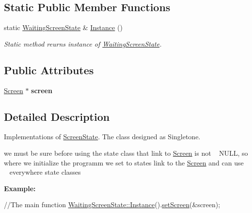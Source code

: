 \subsection*{Static Public Member Functions}
\begin{DoxyCompactItemize}
\item 
static \hyperlink{class_waiting_screen_state}{Waiting\+Screen\+State} \& \hyperlink{class_waiting_screen_state_a0bba467dd415c8e5cadc5acaee5f64f5}{Instance} ()
\begin{DoxyCompactList}\small\item\em Static method reurns instance of \hyperlink{class_waiting_screen_state}{Waiting\+Screen\+State}. \end{DoxyCompactList}\end{DoxyCompactItemize}
\subsection*{Public Attributes}
\begin{DoxyCompactItemize}
\item 
\hypertarget{class_waiting_screen_state_ad10a8cdba52398cf2043ebe6f83b67ee}{}\hyperlink{class_screen}{Screen} $\ast$ {\bfseries screen}\label{class_waiting_screen_state_ad10a8cdba52398cf2043ebe6f83b67ee}

\end{DoxyCompactItemize}


\subsection{Detailed Description}
Implementations of \hyperlink{class_screen_state}{Screen\+State}. The class designed as Singletone.~\newline
 

we must be sure before using the state class that link to \hyperlink{class_screen}{Screen} is not ~\newline
 N\+U\+L\+L, so where we initialize the programm we set to states link to the \hyperlink{class_screen}{Screen} and can use ~\newline
 everywhere state classes ~\newline
 {\bfseries Example\+: 
\begin{DoxyCode}
\textcolor{comment}{//The main function}
\hyperlink{class_waiting_screen_state_a0bba467dd415c8e5cadc5acaee5f64f5}{WaitingScreenState::Instance}().\hyperlink{class_waiting_screen_state_a35c29d113f4110d165fffdfe6ef1a57c}{setScreen}(&screen);
\end{DoxyCode}
 }

